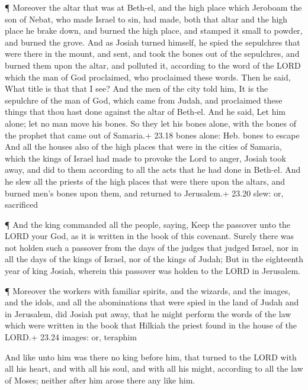  ¶ Moreover the altar that was at Beth-el, and the high
place which Jeroboam the son of Nebat, who made Israel to sin, had made,
both that altar and the high place he brake down, and burned the high
place, and stamped it small to powder, and burned the grove.
 And as Josiah turned himself, he spied the sepulchres that
were there in the mount, and sent, and took the bones out of the
sepulchres, and burned them upon the altar, and polluted it, according
to the word of the LORD which the man of God proclaimed, who proclaimed
these words.  Then he said, What title is that that I see?
And the men of the city told him, It is the sepulchre of the man of God,
which came from Judah, and proclaimed these things that thou hast done
against the altar of Beth-el.  And he said, Let him alone;
let no man move his bones. So they let his bones alone, with the bones
of the prophet that came out of Samaria.+ 23.18 bones alone: Heb. bones
to escape  And all the houses also of the high places that
were in the cities of Samaria, which the kings of Israel had made to
provoke the Lord to anger, Josiah took away, and did to them according
to all the acts that he had done in Beth-el.  And he slew
all the priests of the high places that were there upon the altars, and
burned men's bones upon them, and returned to Jerusalem.+ 23.20 slew:
or, sacrificed

 ¶ And the king commanded all the people, saying, Keep the
passover unto the LORD your God, as it is written in the book of this
covenant.  Surely there was not holden such a passover from
the days of the judges that judged Israel, nor in all the days of the
kings of Israel, nor of the kings of Judah;  But in the
eighteenth year of king Josiah, wherein this passover was holden to the
LORD in Jerusalem.

 ¶ Moreover the workers with familiar spirits, and the
wizards, and the images, and the idols, and all the abominations that
were spied in the land of Judah and in Jerusalem, did Josiah put away,
that he might perform the words of the law which were written in the
book that Hilkiah the priest found in the house of the LORD.+ 23.24
images: or, teraphim

 And like unto him was there no king before him, that
turned to the LORD with all his heart, and with all his soul, and with
all his might, according to all the law of Moses; neither after him
arose there any like him.

